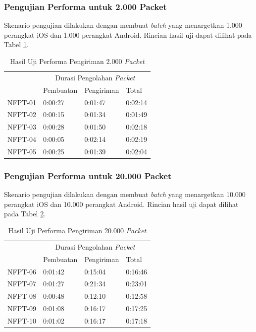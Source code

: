 \subsubsection{Pengujian Performa untuk 2.000 Packet}
\par Skenario pengujian dilakukan dengan membuat \textit{batch} yang menargetkan 1.000 perangkat iOS dan 1.000 perangkat Android. Rincian hasil uji dapat dilihat pada Tabel \ref{t:performa-2k}.
\begin{longtable}{|p{1.5cm}|p{2cm}|p{2cm}|p{2cm}|}
	\caption{Hasil Uji Performa Pengiriman 2.000 \textit{Packet}} \label{t:performa-2k} \\ \hline
	\rowcolor{lightgray} & \multicolumn{3}{c|}{Durasi Pengolahan \textit{Packet}} \\ \hhline{~|*3{-}|}
	\rowcolor{lightgray} \multirow{-2}{*}{Kode} & Pembuatan & Pengiriman & Total \\ \hline
	NFPT-01 & 0:00:27 & 0:01:47 & 0:02:14 \\ \hline 
	NFPT-02 & 0:00:15 & 0:01:34 & 0:01:49 \\ \hline
	NFPT-03 & 0:00:28 & 0:01:50 & 0:02:18 \\ \hline
	NFPT-04 & 0:00:05 & 0:02:14 & 0:02:19 \\ \hline
	NFPT-05 & 0:00:25 & 0:01:39 & 0:02:04 \\ \hline
\end{longtable}

\subsubsection{Pengujian Performa untuk 20.000 Packet}
\par Skenario pengujian dilakukan dengan membuat \textit{batch} yang menargetkan 10.000 perangkat iOS dan 10.000 perangkat Android. Rincian hasil uji dapat dilihat pada Tabel \ref{t:performa-20k}.
\begin{longtable}{|p{1.5cm}|p{2cm}|p{2cm}|p{2cm}|}
	\caption{Hasil Uji Performa Pengiriman 20.000 \textit{Packet}} \label{t:performa-20k} \\ \hline
	\rowcolor{lightgray} & \multicolumn{3}{c|}{Durasi Pengolahan \textit{Packet}} \\ \hhline{~|*3{-}|}
	\rowcolor{lightgray} \multirow{-2}{*}{Kode} & Pembuatan & Pengiriman & Total \\ \hline
	NFPT-06 & 0:01:42 & 0:15:04 & 0:16:46 \\ \hline 
	NFPT-07 & 0:01:27 & 0:21:34 & 0:23:01 \\ \hline
	NFPT-08 & 0:00:48 & 0:12:10 & 0:12:58 \\ \hline
	NFPT-09 & 0:01:08 & 0:16:17 & 0:17:25 \\ \hline
	NFPT-10 & 0:01:02 & 0:16:17 & 0:17:18 \\ \hline
\end{longtable}

